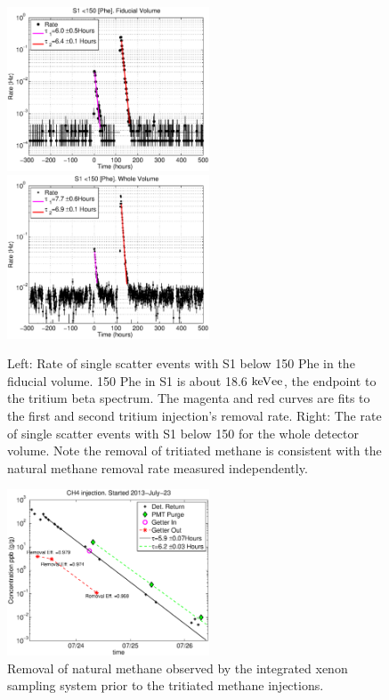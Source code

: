 \begin{figure}[h!]\centering
\includegraphics[width=60mm]{CH3T_Rate_fid_150_Run03_Tritium_Rate.eps}
\includegraphics[width=60mm]{CH3T_Rate_Nofid_150_Run03_Tritium_Rate}
\caption{Left: Rate of single scatter events with S1 below 150 Phe in the fiducial volume. 150 Phe in S1 is about 18.6 $\rm keV{ee}$, the endpoint to the tritium beta spectrum. The magenta and red curves are fits to the first and second tritium injection's removal rate. Right: The rate of single scatter events with S1 below 150 for the whole detector volume. Note the removal of tritiated methane is consistent with the natural methane removal rate measured independently.}
\label{fig:Removal}
\end{figure}

\begin{figure}[h!]\centering
\includegraphics[width=60mm]{CH4_injection.eps}
\caption{Removal of natural methane observed by the integrated xenon sampling system prior to the tritiated methane injections. }
\label{fig:Removal_methane}
\end{figure}

